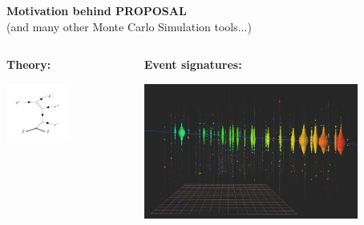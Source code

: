 \begin{frame}
  \centering
  \Huge
  \textbf{Motivation behind PROPOSAL}\\
  \large
  (and many other Monte Carlo Simulation tools...)
  \vspace{5mm}
  \begin{columns}[t]
        \begin{column}{0.45\textwidth}
            \centering
            \textbf{Theory:}
          \begin{minipage}[c]{\textwidth}
            \centering
            \vspace{2mm}
                \includegraphics[trim=25 25 30 30, clip, width=0.6\textwidth]{images/feynman/epair_feynman.pdf}
        \end{minipage}%
        \end{column}
        \begin{column}{0.05\textwidth}
          \vspace{12mm}\\
          \Huge\textbf{\rightarrow}
        \end{column}
        \begin{column}{0.45\textwidth}
          \centering
            \textbf{Event signatures:}
            \begin{minipage}[c]{\textwidth}
              \vspace{4mm}
            \centering
                \includegraphics[width=0.8\textwidth]{images/Track.png}
        \end{minipage}%
        \end{column}
    \end{columns}
\end{frame}



